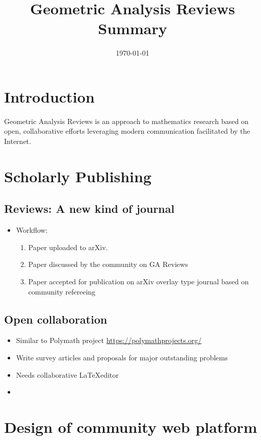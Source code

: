 \documentclass{amsart}
\title[GA Reviews Summary]
 {Geometric Analysis Reviews Summary}
\date{\today}
\begin{document}
\maketitle

\section{Introduction}
\label{sec:intro}

Geometric Analysis Reviews is an approach to mathematics research based on open, collaborative efforts leveraging modern communication facilitated by the Internet.

\section{Scholarly Publishing}
\label{sec:publishing}

\subsection{Reviews: A new kind of journal}
\label{subsec:publishing_reviews}

\begin{itemize}
\item Workflow:
\begin{enumerate}
\item Paper uploaded to arXiv.
\item Paper discussed  by the community on GA Reviews
\item Paper accepted for publication on arXiv overlay type journal based on community refereeing
\end{enumerate}
\end{itemize}

\subsection{Open collaboration}
\label{subsec:publishing_collaboration}


\begin{itemize}
\item Similar to Polymath project \url{https://polymathprojects.org/}
\item Write survey articles and proposals for major outstanding problems
\item Needs collaborative \LaTeX editor
\item 
\end{itemize}

\section{Design of community web platform}
\label{sec:webdesign}
\end{document}
